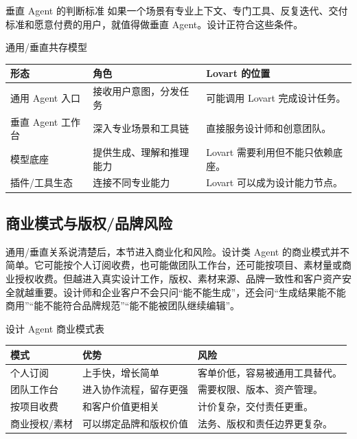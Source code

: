 \documentclass[a4paper]{article}
\begin{document}
\begin{importantbox}{垂直 Agent 的判断标准}
如果一个场景有专业上下文、专门工具、反复迭代、交付标准和愿意付费的用户，就值得做垂直 Agent。设计正符合这些条件。
\end{importantbox}

\begin{knowledgebox}{通用/垂直共存模型}
\begin{tabularx}{\textwidth}{p{}p{}X}
\toprule
形态 & 角色 & Lovart 的位置 \\
\midrule
通用 Agent 入口 & 接收用户意图，分发任务 & 可能调用 Lovart 完成设计任务。 \\
垂直 Agent 工作台 & 深入专业场景和工具链 & 直接服务设计师和创意团队。 \\
模型底座 & 提供生成、理解和推理能力 & Lovart 需要利用但不能只依赖底座。 \\
插件/工具生态 & 连接不同专业能力 & Lovart 可以成为设计能力节点。 \\
\bottomrule
\end{tabularx}
\end{knowledgebox}

\subsection{商业模式与版权/品牌风险}

通用/垂直关系说清楚后，本节进入商业化和风险。设计类 Agent 的商业模式并不简单。它可能按个人订阅收费，也可能做团队工作台，还可能按项目、素材量或商业授权收费。但越进入真实设计工作，版权、素材来源、品牌一致性和客户资产安全就越重要。设计师和企业客户不会只问“能不能生成”，还会问“生成结果能不能商用”“能不能符合品牌规范”“能不能被团队继续编辑”。

\begin{knowledgebox}{设计 Agent 商业模式表}
\begin{tabularx}{\textwidth}{p{}p{}X}
\toprule
模式 & 优势 & 风险 \\
\midrule
个人订阅 & 上手快，增长简单 & 客单价低，容易被通用工具替代。 \\
团队工作台 & 进入协作流程，留存更强 & 需要权限、版本、资产管理。 \\
按项目收费 & 和客户价值更相关 & 计价复杂，交付责任更重。 \\
商业授权/素材 & 可以绑定品牌和版权价值 & 法务、版权和责任边界更复杂。 \\
\bottomrule
\end{tabularx}
\end{knowledgebox}
\end{document}
